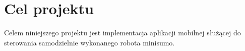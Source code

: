 \chapter{Cel projektu}
Celem niniejszego projektu jest implementacja aplikacji mobilnej służącej do sterowania samodzielnie wykonanego robota minisumo.